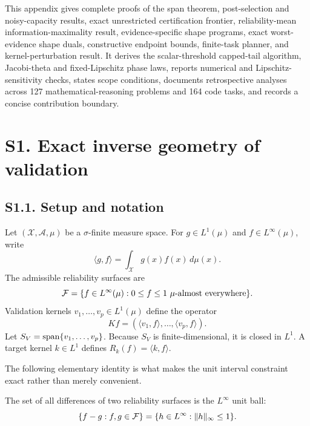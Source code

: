 \raggedbottom

This appendix gives complete proofs of the span theorem, post-selection and noisy-capacity results, exact unrestricted certification frontier, reliability-mean information-maximality result, evidence-specific shape programs, exact worst-evidence shape duals, constructive endpoint bounds, finite-task planner, and kernel-perturbation result. It derives the scalar-threshold capped-tail algorithm, Jacobi-theta and fixed-Lipschitz phase laws, reports numerical and Lipschitz-sensitivity checks, states scope conditions, documents retrospective analyses across 127 mathematical-reasoning problems and 164 code tasks, and records a concise contribution boundary.

\section*{S1. Exact inverse geometry of validation}

\subsection*{S1.1. Setup and notation}

Let $(\mathcal X,\mathcal A,\mu)$ be a $\sigma$-finite measure space. For $g\in L^1(\mu)$ and $f\in L^\infty(\mu)$, write
\[
\langle g,f\rangle=\int_{\mathcal X}g(x)f(x)\,d\mu(x).
\]
The admissible reliability surfaces are
\begin{equation}
\cF=\{f\in L^\infty(\mu):0\le f\le1\ \mu\text{-almost everywhere}\}.
\label{si:eq:F}
\end{equation}
Validation kernels $v_1,\ldots,v_p\in L^1(\mu)$ define the operator
\begin{equation}
Kf=(\langle v_1,f\rangle,\ldots,\langle v_p,f\rangle).
\label{si:eq:K}
\end{equation}
Let $S_V=\operatorname{span}\{v_1,\ldots,v_p\}$. Because $S_V$ is finite-dimensional, it is closed in $L^1$. A target kernel $k\in L^1$ defines $R_k(f)=\langle k,f\rangle$.

The following elementary identity is what makes the unit interval constraint exact rather than merely convenient.

\begin{lemma}
\label{si:lem:difference}
The set of all differences of two reliability surfaces is the $L^\infty$ unit ball:
\begin{equation}
\{f-g:f,g\in\mathcal F\}=\{h\in L^\infty:\|h\|_\infty\le1\}.
\label{si:eq:difference}
\end{equation}
\end{lemma}

